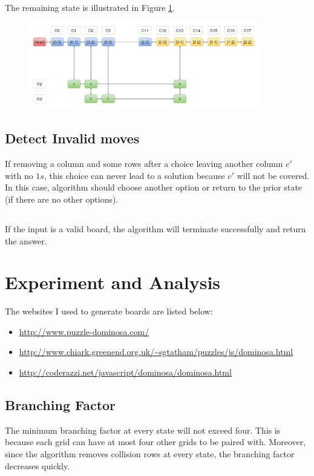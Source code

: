 \documentclass[12pt]{article}
\begin{document}
The remaining state is illustrated in Figure \ref{fig:imp_remove}.

	\begin{figure}[H]
	\centering
	\includegraphics[width=0.9\textwidth]{fig_imp_remove}
	\caption[Caption for the list of figures]{}
	\label{fig:imp_remove}
	\end{figure}
	
\subsection*{Detect Invalid moves}
If removing a column and some rows after a choice leaving another column $c'$ with no $1s$, this choice can never lead to a solution because $c'$ will not be covered. In this case, algorithm should choose another option or return to the prior state (if there are no other options).

\subsection*{}
If the input is a valid board, the algorithm will terminate successfully and return the answer.

\section{Experiment and Analysis}
The websites I used to generate boards are listed below:
\begin{itemize}
	\item \url{http://www.puzzle-dominosa.com/}
	\item \url{http://www.chiark.greenend.org.uk/~sgtatham/puzzles/js/dominosa.html}
	\item \url{http://coderazzi.net/javascript/dominosa/dominosa.html}
\end{itemize}

\subsection*{Branching Factor}
The minimum branching factor at every state will not exceed four. This is because each grid can have at most four other grids to be paired with. Moreover, since the algorithm removes collision rows at every state, the branching factor decreases quickly.
\end{document}
